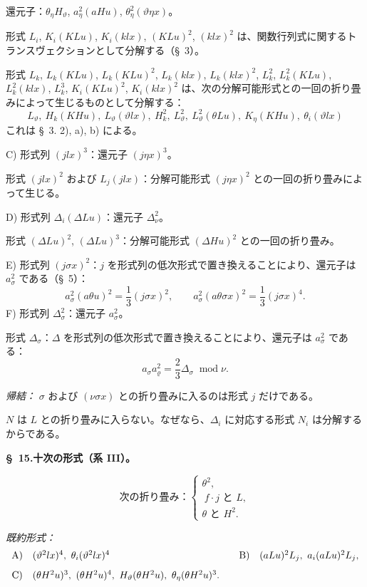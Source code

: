 \documentclass[11pt]{article}
\newcommand{\A}{\Delta}
\newcommand{\R}{\varrho}
\newcommand{\modu}[1]{\;\operatorname{mod} #1}
\begin{document}
還元子：$\theta_\eta H_\vartheta$, $a_\eta^2(aHu)$, $\theta_\eta^2(\vartheta\eta x)$。

形式 $L_i$, $K_i(KLu)$, $K_i(klx)$, $(KLu)^2$, $(klx)^2$ は、関数行列式に関するトランスヴェクションとして分解する（\S\ 3）。

形式 $L_k$, $L_k(KLu)$, $L_k(KLu)^2$, $L_k(klx)$, $L_k(klx)^2$, $L_k^2$, $L_k^2(KLu)$, $L_k^2(klx)$, $L_k^3$, $K_i(KLu)^2$, $K_i(klx)^2$ は、次の分解可能形式との一回の折り畳みによって生じるものとして分解する：
\[
L_\vartheta,
\ H_k(KHu),
\ L_\vartheta(\vartheta lx),
\ H_k^2,
\ L_\vartheta^2,
\ L_\vartheta^2(\theta Lu),
\ K_\eta(KHu),
\ \theta_i(\vartheta lx)
\]
これは \S\ 3. 2), a), b) による。

C) 形式列 $(jlx)^3$：還元子 $(j\eta x)^3$。

形式 $(jlx)^2$ および $L_j(jlx)$：分解可能形式 $(j\eta x)^2$ との一回の折り畳みによって生じる。

D) 形式列 $\A_i(\A Lu)$：還元子 $\A_\nu^2$。

形式 $(\A Lu)^2$, $(\A Lu)^3$：分解可能形式 $(\A Hu)^2$ との一回の折り畳み。

E) 形式列 $(j\sigma x)^2$：$j$ を形式列の低次形式で置き換えることにより、還元子は $a_\sigma^2$ である（\S\ 5）：
\[
a_\sigma^2(a\theta u)^2=\frac13(j\sigma x)^2,
\qquad
a_\sigma^2(a\theta\sigma x)^2=\frac13(j\sigma x)^4.
\]
F) 形式列 $\A_\sigma^2$：還元子 $a_\sigma^2$。

形式 $\A_\sigma$：$\A$ を形式列の低次形式で置き換えることにより、還元子は $a_\sigma^2$ である：
\[
a_\sigma a_\R^2=\frac23\A_\sigma\modu{\nu}.
\]

\noindent\emph{帰結：} $\sigma$ および $(\nu\sigma x)$ との折り畳みに入るのは形式 $j$ だけである。

$N$ は $L$ との折り畳みに入らない。なぜなら、$\A_i$ に対応する形式 $N_i$ は分解するからである。

\begin{center}
\textbf{\S\ 15.\quad 十次の形式（系 III）。}
\end{center}
\[
\text{次の折り畳み：}\left\{\begin{array}{l}
\theta^2,\\
\ f\cdot j\text{ と }L,\\
\theta\text{ と }H^2.
\end{array}\right.
\]

\noindent\emph{既約形式：}
\[
\begin{array}{c@{\quad}l@{\qquad}c@{\quad}l}
\text{A)}&(\vartheta^2lx)^4,
\ \theta_i(\vartheta^2lx)^4&
\text{B)}&(aLu)^2L_j,
\ a_i(aLu)^2L_j,\\[0.8em]
\text{C)}&(\theta H^2u)^3,
\ (\theta H^2u)^4,
\ H_\vartheta(\theta H^2u),
\ \theta_\eta(\theta H^2u)^3.
\end{array}
\]
\end{document}
